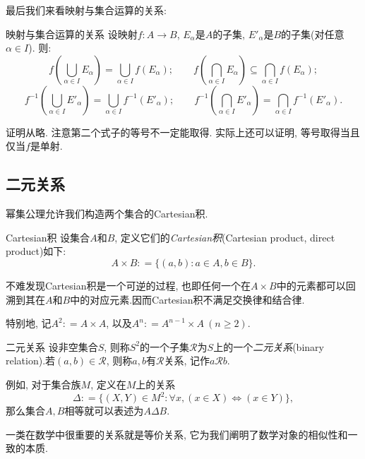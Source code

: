 最后我们来看映射与集合运算的关系: 

\begin{proposition}{映射与集合运算的关系}
	设映射$f:A \to B$, $E_{\alpha}$是$A$的子集, $E'_{\alpha}$是$B$的子集(对任意$\alpha \in I$). 则: 
	$$f \left( \bigcup_{\alpha \in I} E_{\alpha} \right) = \bigcup_{\alpha \in I} f(E_{\alpha});\qquad f \left( \bigcap_{\alpha \in I} E_{\alpha} \right) \subseteq \bigcap_{\alpha \in I} f(E_{\alpha}); $$
	$$f^{-1} \left( \bigcup_{\alpha \in I} E'_{\alpha} \right) = \bigcup_{\alpha \in I} f^{-1}(E'_{\alpha});\qquad f^{-1} \left( \bigcap_{\alpha \in I} E'_{\alpha} \right) = \bigcap_{\alpha \in I} f^{-1}(E'_{\alpha}). $$
\end{proposition}
\begin{remark}
	证明从略. 注意第二个式子的等号不一定能取得. 实际上还可以证明, 等号取得当且仅当$f$是单射. 
\end{remark}

\subsection{二元关系}

幂集公理允许我们构造两个集合的Cartesian积.

\begin{definition}{Cartesian积}
	设集合$A$和$B$, 定义它们的\textit{Cartesian积}(Cartesian product,  direct product)如下: $$A \times B : = \{ (a, b): a \in A, b \in B \}.$$
\end{definition}
\begin{remark}
	不难发现Cartesian积是一个可逆的过程, 也即任何一个在$A \times B$中的元素都可以回溯到其在$A$和$B$中的对应元素.因而Cartesian积不满足交换律和结合律.
\end{remark}
\begin{remark}
	特别地, 记$A^2: =A \times A$, 以及$A^n : = A^{n-1} \times A~(n \geq 2)$.
\end{remark}

\begin{definition}{二元关系}
	设非空集合$S$, 则称$S^2$的一个子集$\mathcal{R}$为$S$上的一个\textit{二元关系}(binary relation).若$(a, b) \in \mathcal{R}$, 则称$a, b$有$\mathcal{R}$关系, 记作$a\mathcal{R}b$.
\end{definition}

例如, 对于集合族$M$, 定义在$M$上的关系$$\Delta : = \{ (X, Y) \in M^2 :  \forall x, (x \in X) \Leftrightarrow (x \in Y) \}, $$
那么集合$A, B$相等就可以表述为$A \Delta B$.

一类在数学中很重要的关系就是等价关系, 它为我们阐明了数学对象的相似性和一致的本质.

